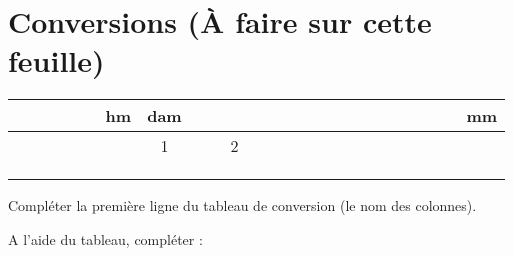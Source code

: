 \section{Conversions (\`A faire sur cette feuille) }


\begin{center}
	\begin{tabular}{|@{\ \ \ }c@{\ \ \ }|@{\ \ \ }c@{\ \ \ }|@{\ \ \ }c@{\ \ \ }|@{\ \ \ }c@{\ \ \ }|@{\ \ \ }c@{\ \ \ }|@{\ \ \ }c@{\ \ \ }|@{\ \ \ }c@{\ \ \ }|}
		\hline
		\ \ \ \ \ \ \ \  & \textbf{hm} & \textbf{dam} & \ \ \ \ \ \ \ \    & \ \ \ \ \ \ \ \   & \ \ \ \ \ \ \ \  & \textbf{mm} \\ \hline
		&             & 1            & 2 &  &  &             \\ \hline
		&             &              &   &  &  &             \\ \hline
		&             &              &   &  &  &             \\ \hline
		&             &              &   &  &  &             \\ \hline
	\end{tabular}
\end{center}

\begin{questions}
	\question Compléter la première ligne du tableau de conversion (le nom des colonnes).
	
	\question A l'aide du tableau, compléter :
		\begin{parts}
			 
		\end{parts}
\end{questions}